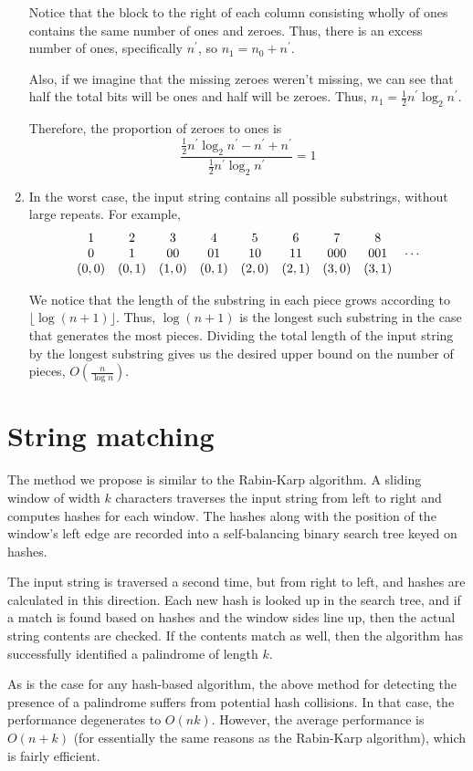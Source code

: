 \documentclass{article}
\begin{document}
\begin{enumerate}
        Notice that the block to the right of each column consisting wholly of
        ones contains the same number of ones and zeroes. Thus, there is an
        excess number of ones, specifically $n^\prime$, so
        $n_1 = n_0 + n^\prime$.

        Also, if we imagine that the missing zeroes weren't missing, we can
        see that half the total bits will be ones and half will be zeroes.
        Thus, $n_1 = \frac{1}{2} n^\prime \log_2 {n^\prime}$.

        Therefore, the proportion of zeroes to ones is
        $$
        \frac{\frac{1}{2} n^\prime \log_2 {n^\prime} - n^\prime + n^\prime}
        {\frac{1}{2} n^\prime \log_2 {n^\prime}} = 1
        $$

    \item In the worst case, the input string contains all possible substrings,
        without large repeats. For example,
        $$
        \begin{array}{c c c c c c c c c}
            1 & 2 & 3  & 4  & 5  & 6  & 7   & 8   & ~ \\
            0 & 1 & 00 & 01 & 10 & 11 & 000 & 001 & \cdots \\
            (0, 0) & (0, 1) & (1, 0) & (0, 1) & (2, 0) & (2, 1) & (3, 0) & (3,
            1) & ~
        \end{array}
        $$

        We notice that the length of the substring in each piece grows
        according to $\lfloor \log (n + 1) \rfloor$. Thus, $\log {(n+1)}$ is
        the longest such substring in the case that generates the most pieces.
        Dividing the total length of the input string by the longest substring
        gives us the desired upper bound on the number of pieces,
        $O(\frac{n}{\log n})$.

\end{enumerate}

\section{String matching}

The method we propose is similar to the Rabin-Karp algorithm. A sliding window
of width $k$ characters traverses the input string from left to right
and computes hashes for each window. The hashes along with the position of the
window's left edge are recorded into a self-balancing binary search tree keyed
on hashes.

The input string is traversed a second time, but from right to left,
and hashes are calculated in this direction. Each new hash is looked up in the
search tree, and if a match is found based on hashes and the window sides line
up, then the actual string contents are checked. If the contents match as well,
then the algorithm has successfully identified a palindrome of length $k$.

As is the case for any hash-based algorithm, the above method for detecting the
presence of a palindrome suffers from potential hash collisions. In that case,
the performance degenerates to $O(nk)$. However, the average performance is
$O(n + k)$ (for essentially the same reasons as the Rabin-Karp algorithm),
which is fairly efficient.
\end{document}
